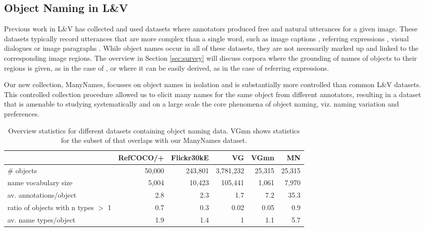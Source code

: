 \subsection{Object Naming in L\&V} 
Previous work in L\&V has collected and used datasets where annotators produced free and natural utterances for a given image. 
These datasets typically record utterances that are more complex than a single word, such as image captions \cite{fangetal:2015,devlin:imcaqui,Bernardietal:automatic}, referring expressions \cite{Kazemzadeh2014,mao15,Yu2016}, visual dialogues \cite{das2017visual,vries2017guesswhat} or image paragraphs \cite{krause2017hierarchical}. 
While object names occur in all of these datasets, they are not necessarily marked up and linked to the corresponding image regions. The overview in Section \ref{sec:survey} will discuss corpora where the grounding of names of objects to their regions is given, as in the case of \vgenome \cite{krishna2016visualgenome}, or where it can be easily derived, as in the case of referring expressions.

Our new collection, ManyNames, focusses on object names in isolation and is substantially more controlled than common L\&V datasets. This controlled collection procedure allowed us to elicit many names for the same object from different annotators, resulting in a dataset that is amenable to  studying systematically and on a large scale the core phenomena of object naming, viz. naming variation and preferences.

\begin{table*}[htb]
  \centering
  \begin{tabular}{lrrrrr}
    \toprule
    &   RefCOCO/+  &  Flickr30kE &           VG &      VGmn &        MN \\
    \midrule
    \# objects & 50,000 & 243,801 & 3,781,232 & 25,315 & 25,315 \\
    name vocabulary size &  5,004 &  10,423 &   105,441 &  1,061 &  7,970 \\
    av. annotations/object &      2.8 &       2.3 &         1.7 &      7.2 &     35.3 \\
    ratio of objects with n types $>$ 1 &      0.7 &       0.3 &         0.02 &      0.05 &      0.9 \\
    av. name types/object &      1.9 &       1.4 &         1 &      1.1 &      5.7 \\
    \bottomrule
  \end{tabular}
  \caption{Overview statistics for different datasets containing object naming data. VGmn shows statistics for the subset of \vg that overlaps with our ManyNames dataset.\label{tab:compare}}
\end{table*}


